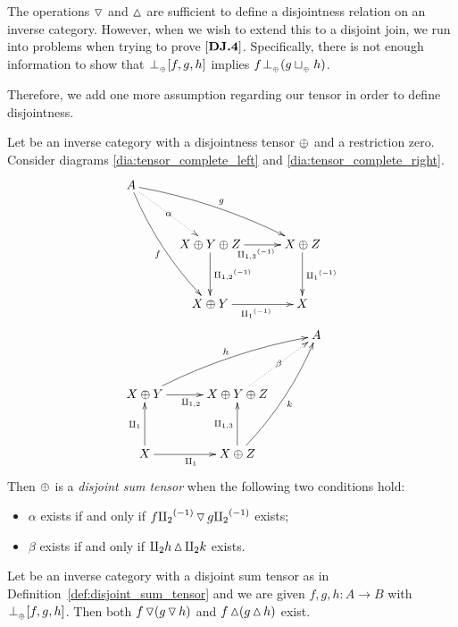 The operations $\operatorname{\triangledown}$ and $\operatorname{\vartriangle}$ are sufficient to define a disjointness relation
on an inverse category. However, when we wish to extend this to a disjoint join, we run into
problems when trying to prove $[\text{\bfseries {DJ}.{4}}]$. Specifically, there is not enough information to
show that ${}_{{}_{}}{\perp_{{}_{\oplus}}} [f,g,h]$ implies $f {}_{{}_{}}{\perp_{{}_{\oplus}}} (g \sqcup_{{_{\oplus}}} h)$.

Therefore, we add one more assumption regarding our tensor in order to define disjointness.

\begin{definition}\label{def:disjoint_sum_tensor}
  Let \X be an inverse category with a disjointness tensor $\oplus$ and a restriction zero. Consider
  diagrams \ref{dia:tensor_complete_left} and \ref{dia:tensor_complete_right}.
  \begin{align}
    &\xymatrix@C+5pt@R+10pt{
      A \ar@/_/[ddr]_f \ar@/^/[drr]^g \ar@{.>}[dr]|-{\alpha} \\
        & X\+Y\+Z \ar[d]^{\icp{1,2}} \ar[r]_{\icp{1,3}} & X\+Z \ar[d]^{\icpa} \\
        & X\+Y \ar[r]_{\icpa} & X
    } \label{dia:tensor_complete_left}\\
    &\xymatrix@C+5pt@R+10pt{
        &&A \\
         X\+Y \ar[r]_{\cp{1,2}} \ar@/^/[urr]^h &X\+Y\+Z \ar@{.>}[ur]|-{\beta} \\
         X \ar[u]^{\cpa} \ar[r]_{\cpa} & X\+Z \ar[u]^{\cp{1,3}} \ar@/_/[uur]_k
    } \label{dia:tensor_complete_right}
  \end{align}
  Then
  $\oplus$ is a \emph{disjoint sum tensor} when the following two conditions hold:
  \begin{itemize}
    \item $\alpha$ exists if and only if  $f {\amalg_{2}}^{(-1)} \operatorname{\triangledown} g {\amalg_{2}}^{(-1)}$ exists;
    \item $\beta$ exists if and only if $\amalg_{2} h \operatorname{\vartriangle} \amalg_{2} k$ exists.
  \end{itemize}

\end{definition}
\begin{lemma}\label{lem:complete_disjointness_means_multiple_disjoints}
  Let \X be an inverse category with a disjoint sum tensor as in
  Definition~\ref{def:disjoint_sum_tensor} and we are given $f,g,h:A\to B$ with
  ${}_{{}_{}}{\perp_{{}_{\oplus}}}[f,g,h]$. Then both $f \operatorname{\triangledown} (g \operatorname{\triangledown} h)$ and $f\operatorname{\vartriangle}(g\operatorname{\vartriangle} h)$ exist.
\end{lemma}
